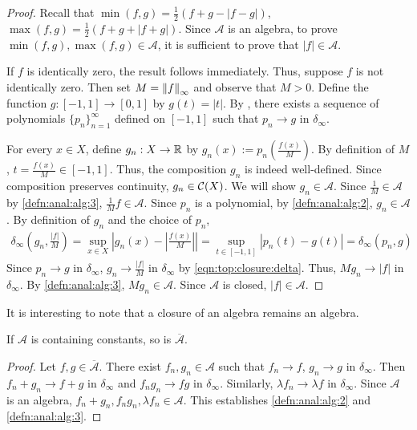 \begin{proof}
Recall that $\min(f,g) = \frac{1}{2}(f + g - | f - g |)$, $\max(f,g) = \frac{1}{2}(f + g + | f + g |)$.
Since $\mathcal{A}$ is an algebra, to prove $\min(f,g), \max(f,g) \in \mathcal{A}$, it is sufficient to prove that $|f| \in \mathcal{A}$. 

If $f$ is identically zero, the result follows immediately. Thus, suppose $f$ is not identically zero. Then set $M = \left\lVert f\right\rVert_{\infty}$ and observe that $M > 0$. Define the function $g : [-1, 1] \to [0,1]$ by $g(t) = | t |$. By , there exists a sequence of polynomials $\{ p_n \}_{n = 1}^{\infty}$ defined on $[-1,1]$ such that $p_n \rightarrow g$ in $\delta_\infty$.

For every $x \in X$, define $g_n : X \to {\mathbb R}$ by $g_n (x) := p_n(\frac{f(x)}{M})$. By definition of $M$, $ t = \frac{f(x)}{M} \in [-1,1]$. Thus, the composition $g_n$ is indeed well-defined. Since composition preserves continuity, $g_n \in {\mathcal C}(X)$. We will show $g_n \in \mathcal{A}$. Since $\frac{1}{M} \in \mathcal{A}$  by \ref{defn:anal:alg:3}, $\frac{1}{M} f \in \mathcal{A}$. Since $p_n$ is a polynomial, by \ref{defn:anal:alg:2}, $g_n  \in \mathcal{A}$.
By definition of $g_n$ and the choice of $p_n$,
\begin{align}
    \label{eqn:top:closure:delta}
    \delta_\infty \left(g_n, \frac{|f|}{M} \right ) = \sup_{x \in X} \left| g_n(x) - \left | \frac{f(x)}{M} \right| \right | = \sup_{t \in [-1,1]} \left | p_n(t) - g(t)  \right | =  \delta_\infty \left(p_n, g \right)
\end{align}
Since $p_n \rightarrow g$ in $\delta_\infty$, $g_n \rightarrow \frac{|f|}{M}$ in $\delta_\infty$ by \ref{eqn:top:closure:delta}.
Thus, $M g_n \rightarrow |f|$ in $\delta_\infty$. By \ref{defn:anal:alg:3}, $M g_n \in \mathcal{A}$. Since $\mathcal{A}$ is closed, $|f| \in \mathcal{A}$.

\end{proof}
It is interesting to note that a closure of an algebra remains an algebra.
\begin{lemma}
\label{lemma:top:unifclosure}
If $\mathcal{A}$ is  containing constants, so is $\overline{\mathcal{A}}$.
\end{lemma}
\begin{proof}
Let $f, g \in \overline{\mathcal{A}}$. There exist $f_n, g_n \in \mathcal{A}$ such that $f_n \to f$, $g_n \to g$ in $\delta_\infty$. Then $f_n + g_n \rightarrow f + g$ in $\delta_\infty$ and $f_n g_n \rightarrow f g$ in $\delta_\infty$. Similarly, $\lambda f_n \rightarrow \lambda f$ in $\delta_\infty$.
Since $\mathcal{A}$ is an algebra, $f_n + g_n, f_n g_n, \lambda f_n \in \mathcal{A}$. This establishes
\ref{defn:anal:alg:2} and \ref{defn:anal:alg:3}.
\end{proof}

